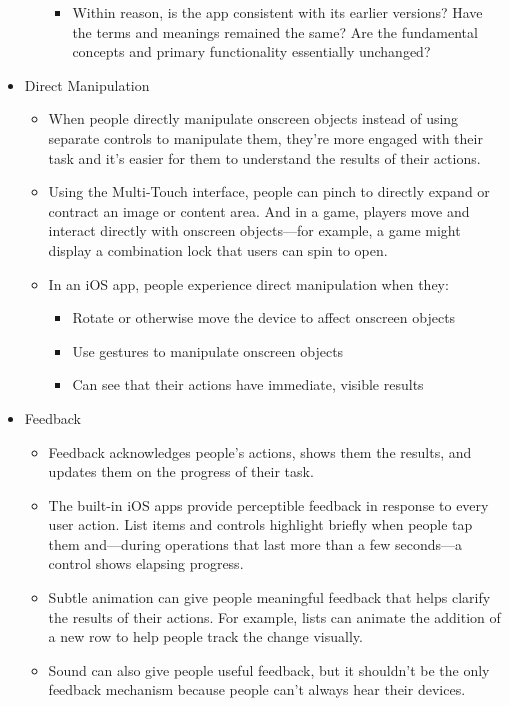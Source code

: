\begin{itemize}
\begin{itemize}
\begin{itemize}
		\item Within reason, is the app consistent with its earlier versions? Have the terms and meanings remained the same? Are the fundamental concepts and primary functionality essentially unchanged?
		\end{itemize}
	\end{itemize}
\item Direct Manipulation
	\begin{itemize}
	\item When people directly manipulate onscreen objects instead of using separate controls to manipulate them, they're more engaged with their task and it’s easier for them to understand the results of their actions. 
	\item Using the Multi-Touch interface, people can pinch to directly expand or contract an image or content area. And in a game, players move and interact directly with onscreen objects—for example, a game might display a combination lock that users can spin to open. 
	\item In an iOS app, people experience direct manipulation when they: 
		\begin{itemize}
		\item Rotate or otherwise move the device to affect onscreen objects 
		\item Use gestures to manipulate onscreen objects 
		\item Can see that their actions have immediate, visible results 
		\end{itemize}
	\end{itemize}
\item Feedback
	\begin{itemize}
	\item Feedback acknowledges people’s actions, shows them the results, and updates them on the progress of their task. 
	\item  The built-in iOS apps provide perceptible feedback in response to every user action. List items and controls highlight briefly when people tap them and—during operations that last more than a few seconds—a control shows elapsing progress.
	\item Subtle animation can give people meaningful feedback that helps clarify the results of their actions. For example, lists can animate the addition of a new row to help people track the change visually.
	\item Sound can also give people useful feedback, but it shouldn’t be the only feedback mechanism because people can’t always hear their devices. 

\end{itemize}
\end{itemize}
